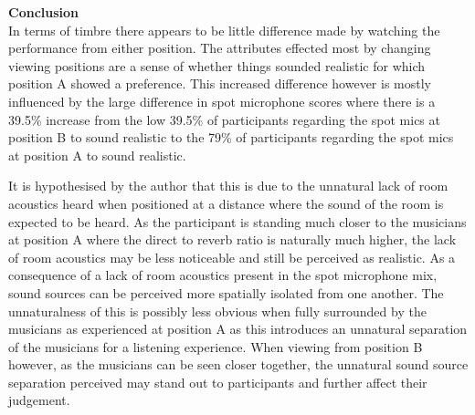 	\begin{table}[h]
	\centering
		\caption{Table showing the percentage difference between each pair of microphones calculated by $A - B$}
		\label{ana4:barData}
	\end{table}



	\textbf{Conclusion} \\

		In terms of timbre there appears to be little difference made by watching the performance from either position. The attributes effected most by changing viewing positions are a sense of whether things sounded realistic for which position A showed a preference. This increased difference however is mostly influenced by the large difference in spot microphone scores where there is a 39.5\% increase from the low 39.5\% of participants regarding the spot mics at position B to sound realistic to the 79\% of participants regarding the spot mics at position A to sound realistic. 

		It is hypothesised by the author that this is due to the unnatural lack of room acoustics heard when positioned at a distance where the sound of the room is expected to be heard. As the participant is standing much closer to the musicians at position A where the direct to reverb ratio is naturally much higher, the lack of room acoustics may be less noticeable and still be perceived as realistic. As a consequence of a lack of room acoustics present in the spot microphone mix, sound sources can be perceived more spatially isolated from one another. The unnaturalness of this is possibly less obvious when fully surrounded by the musicians as experienced at position A as this introduces an unnatural separation of the musicians for a listening experience. When viewing from position B however, as the musicians can be seen closer together, the unnatural sound source separation perceived may stand out to participants and further affect their judgement. \\


